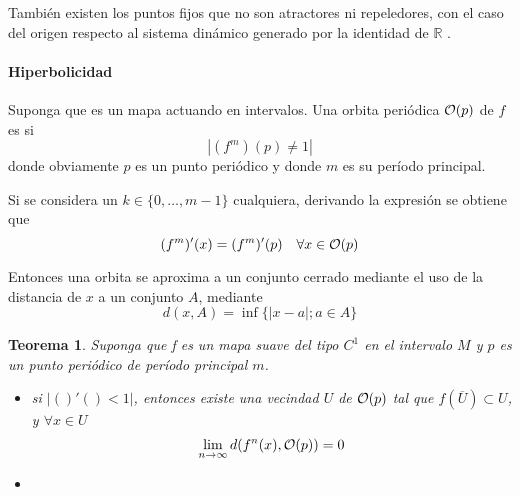 \documentclass[12pt]{book}
\newcommand{\R}{\ensuremath{\mathbb{R}} }
\newtheorem{mytheo}{Teorema}
\begin{document}
También existen los puntos fijos  que no son atractores ni
repeledores, con el caso del origen respecto al sistema dinámico generado por la
identidad de \R.

\paragraph{Hiperbolicidad} Suponga que \map es un mapa  actuando en
intervalos. Una orbita periódica $\mathcal{O}(p)$ de $f$ es  si
$$
	| (f^m)(p) \not = 1 |
$$
donde obviamente $p$ es un punto periódico y donde $m$ es su período principal.

Si se considera un $k \in \{0, \ldots, m-1\}$ cualquiera, derivando la expresión
se obtiene que 
$$
	(f^m)'(x) = (f^m)'(p) \quad \forall x \in \mathcal{O}(p)
$$

Entonces una orbita se aproxima a un conjunto cerrado mediante el uso de la
distancia de $x$ a un conjunto $A$, mediante
$$
	d(x, A) = \inf \{|x-a|; a \in A\}
$$

\begin{mytheo}
Suponga que f es un mapa suave del tipo $C^1$ en el intervalo $M$ y $p$ es un
punto periódico de período principal $m$.
\begin{itemize}
	\item si $|()'() < 1|$, entonces existe una vecindad $U$ de $\mathcal{O}(p)$ tal
que $f(\overline{U}) \subset U$, y $\forall x \in U$
$$
	\lim_{n \rightarrow \infty} d(f^n(x), \mathcal{O}(p)) = 0
$$
	\item 
\end{itemize}
\end{mytheo}
\end{document}
